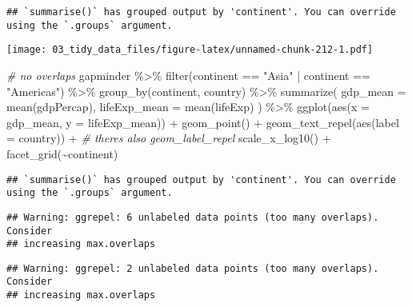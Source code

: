 \documentclass[
]{book}
\newenvironment{Shaded}{\begin{snugshade}}{\end{snugshade}}
\newcommand{\AttributeTok}[1]{\textcolor[rgb]{0.77,0.63,0.00}{#1}}
\newcommand{\CommentTok}[1]{\textcolor[rgb]{0.56,0.35,0.01}{\textit{#1}}}
\newcommand{\FunctionTok}[1]{\textcolor[rgb]{0.00,0.00,0.00}{#1}}
\newcommand{\NormalTok}[1]{#1}
\newcommand{\SpecialCharTok}[1]{\textcolor[rgb]{0.00,0.00,0.00}{#1}}
\newcommand{\StringTok}[1]{\textcolor[rgb]{0.31,0.60,0.02}{#1}}
\begin{document}
\begin{verbatim}
## `summarise()` has grouped output by 'continent'. You can override using the `.groups` argument.
\end{verbatim}

\texttt{[image: 03\_tidy\_data\_files/figure-latex/unnamed-chunk-212-1.pdf]}

\begin{Shaded}
\begin{Highlighting}[]
\CommentTok{\# no overlaps}
\NormalTok{gapminder }\SpecialCharTok{\%\textgreater{}\%}
  \FunctionTok{filter}\NormalTok{(continent }\SpecialCharTok{==} \StringTok{"Asia"} \SpecialCharTok{|}\NormalTok{ continent }\SpecialCharTok{==} \StringTok{"Americas"}\NormalTok{) }\SpecialCharTok{\%\textgreater{}\%}
  \FunctionTok{group\_by}\NormalTok{(continent, country) }\SpecialCharTok{\%\textgreater{}\%}
  \FunctionTok{summarize}\NormalTok{(}
    \AttributeTok{gdp\_mean =} \FunctionTok{mean}\NormalTok{(gdpPercap),}
    \AttributeTok{lifeExp\_mean =} \FunctionTok{mean}\NormalTok{(lifeExp)}
\NormalTok{  ) }\SpecialCharTok{\%\textgreater{}\%}
  \FunctionTok{ggplot}\NormalTok{(}\FunctionTok{aes}\NormalTok{(}\AttributeTok{x =}\NormalTok{ gdp\_mean, }\AttributeTok{y =}\NormalTok{ lifeExp\_mean)) }\SpecialCharTok{+}
  \FunctionTok{geom\_point}\NormalTok{() }\SpecialCharTok{+}
  \FunctionTok{geom\_text\_repel}\NormalTok{(}\FunctionTok{aes}\NormalTok{(}\AttributeTok{label =}\NormalTok{ country)) }\SpecialCharTok{+} \CommentTok{\# there\textquotesingle{}s also geom\_label\_repel}
  \FunctionTok{scale\_x\_log10}\NormalTok{() }\SpecialCharTok{+}
  \FunctionTok{facet\_grid}\NormalTok{(}\SpecialCharTok{\textasciitilde{}}\NormalTok{continent)}
\end{Highlighting}
\end{Shaded}

\begin{verbatim}
## `summarise()` has grouped output by 'continent'. You can override using the `.groups` argument.
\end{verbatim}

\begin{verbatim}
## Warning: ggrepel: 6 unlabeled data points (too many overlaps). Consider
## increasing max.overlaps
\end{verbatim}

\begin{verbatim}
## Warning: ggrepel: 2 unlabeled data points (too many overlaps). Consider
## increasing max.overlaps
\end{verbatim}
\end{document}
